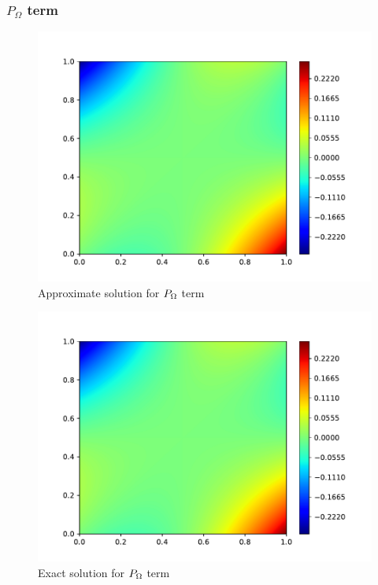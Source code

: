 \subsubsection{$P_{\Omega}$ term}
\begin{figure}[H]
    \includegraphics[height=0.35\textheight]{media/enstrophy-transport-terms/SGS-prod-approx.pdf}
    \caption{Approximate solution for $P_{\Omega}$ term}
    \label{fig:p-approx}
\end{figure}
\begin{figure}[H]
    \includegraphics[height=0.35\textheight]{media/enstrophy-transport-terms/SGS-prod-exact.pdf}
    \caption{Exact solution for $P_{\Omega}$ term}
    \label{fig:p-exact}
\end{figure}

